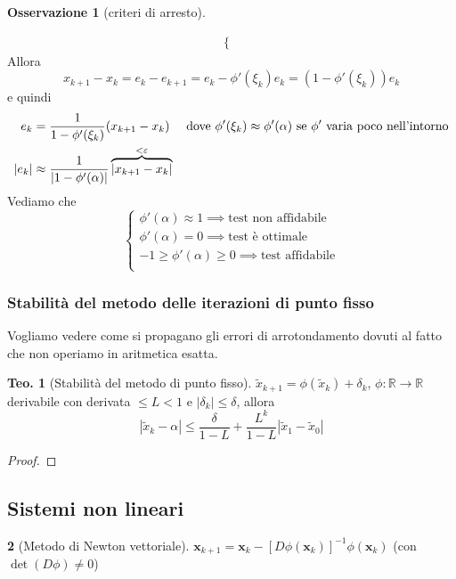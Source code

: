 \documentclass[a4paper,10pt]{article}
\theoremstyle{definition}
\theoremstyle{indentdefinition}
\theoremstyle{indenttheorem}
\newtheorem{thm}{Teo.}
\theoremstyle{myremark}
\newtheorem*{rem*}{Osservazione}
\theoremstyle{indentgeneral}
\newtheorem{lyxalgorithm}[thm]{\protect\algorithmname}
\theoremstyle{plain}
\theoremstyle{plain}
\begin{document}
\begin{rem*}[criteri di arresto]
\begin{itemize}
\begin{align*}
\begin{cases}
    \end{cases}
\end{align*}
Allora
$$x_{k+1}-x_k=e_k-e_{k+1}=e_k-\phi'(\xi_k)e_k=(1-\phi'(\xi_k))e_k$$
e quindi
\begin{align*}
    e_k&=\frac{1}{1-\phi'(\xi_k)}(x_{k+1}-x_k) \quad\text{ dove $\phi'(\xi_k)\approx\phi'(\alpha)$  se $\phi'$ varia poco nell'intorno}\\
    \abs{e_k}&\approx\frac{1}{\abs{1-\phi'(\alpha)}}\overbrace{\abs{x_{k+1}-x_k}}^{<\varepsilon}
\end{align*}
Vediamo che 
$$\begin{cases}
    {\phi'(\alpha)}\approx 1 \implies  \text{test non affidabile}\\
    {\phi'(\alpha)}=0 \implies \text{test è ottimale}\\
    -1\ge{\phi'(\alpha)}\ge 0 \implies \text{test affidabile}\\
\end{cases}$$
\end{itemize}
\end{rem*}
\subsubsection{Stabilità del metodo delle iterazioni di punto fisso}
Vogliamo vedere come si propagano gli errori di arrotondamento dovuti al fatto che non operiamo in aritmetica esatta.
\begin{thm}[Stabilità del metodo di punto fisso]
$\tilde{x}_{k+1}=\phi\left(\tilde{x}_{k}\right)+\delta_{k}$, $\phi:\mathbb{R}\rightarrow\mathbb{R}$
derivabile con derivata $\leq L<1$ e $\left|\delta_{k}\right|\leq\delta$,
allora 
\[
\left|\tilde{x}_{k}-\alpha\right|\leq\frac{\delta}{1-L}+\frac{L^{k}}{1-L}\left|\tilde{x}_{1}-\tilde{x}_{0}\right|
\]
\end{thm}
\begin{proof}
\end{proof}

\subsection{Sistemi non lineari}
\begin{lyxalgorithm}[Metodo di Newton vettoriale]
$\boldsymbol{x}_{k+1}=\boldsymbol{x}_{k}-\left[D\phi\left(\boldsymbol{x}_{k}\right)\right]^{-1}\phi\left(\boldsymbol{x}_{k}\right)$
(con $\det\left(D\phi\right)\neq0$)
\end{lyxalgorithm}
\end{document}
